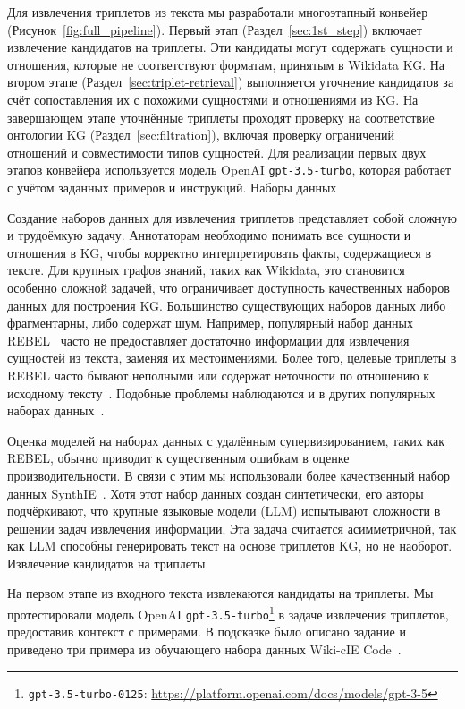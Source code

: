 Для извлечения триплетов из текста мы разработали многоэтапный конвейер (Рисунок~\ref{fig:full_pipeline}). Первый этап (Раздел~\ref{sec:1st_step}) включает извлечение кандидатов на триплеты. Эти кандидаты могут содержать сущности и отношения, которые не соответствуют форматам, принятым в Wikidata KG. На втором этапе (Раздел~\ref{sec:triplet-retrieval}) выполняется уточнение кандидатов за счёт сопоставления их с похожими сущностями и отношениями из KG. На завершающем этапе уточнённые триплеты проходят проверку на соответствие онтологии KG (Раздел~\ref{sec:filtration}), включая проверку ограничений отношений и совместимости типов сущностей. Для реализации первых двух этапов конвейера используется модель OpenAI \texttt{gpt-3.5-turbo}, которая работает с учётом заданных примеров и инструкций.
Наборы данных

Создание наборов данных для извлечения триплетов представляет собой сложную и трудоёмкую задачу. Аннотаторам необходимо понимать все сущности и отношения в KG, чтобы корректно интерпретировать факты, содержащиеся в тексте. Для крупных графов знаний, таких как Wikidata, это становится особенно сложной задачей, что ограничивает доступность качественных наборов данных для построения KG. Большинство существующих наборов данных либо фрагментарны, либо содержат шум. Например, популярный набор данных REBEL~\cite{huguet-cabot-navigli-2021-rebel} часто не предоставляет достаточно информации для извлечения сущностей из текста, заменяя их местоимениями. Более того, целевые триплеты в REBEL часто бывают неполными или содержат неточности по отношению к исходному тексту~\cite{josifoski2023exploiting}. Подобные проблемы наблюдаются и в других популярных наборах данных~\cite{josifoski2021genie}.

Оценка моделей на наборах данных с удалённым супервизированием, таких как REBEL, обычно приводит к существенным ошибкам в оценке производительности. В связи с этим мы использовали более качественный набор данных SynthIE~\cite{josifoski2023exploiting}. Хотя этот набор данных создан синтетически, его авторы подчёркивают, что крупные языковые модели (LLM) испытывают сложности в решении задач извлечения информации. Эта задача считается асимметричной, так как LLM способны генерировать текст на основе триплетов KG, но не наоборот.
Извлечение кандидатов на триплеты

\label{sec:1st_step}
На первом этапе из входного текста извлекаются кандидаты на триплеты. Мы протестировали модель OpenAI \texttt{gpt-3.5-turbo}\footnote{\texttt{gpt-3.5-turbo-0125}: \url{https://platform.openai.com/docs/models/gpt-3-5}} в задаче извлечения триплетов, предоставив контекст с примерами. В подсказке было описано задание и приведено три примера из обучающего набора данных Wiki-cIE Code~\cite{josifoski2023exploiting}.

